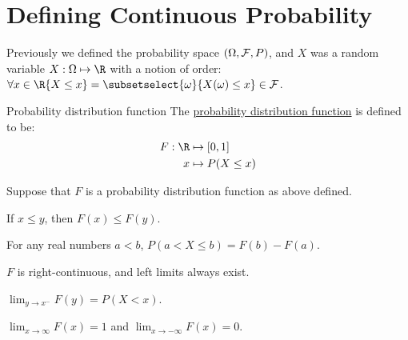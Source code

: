 \documentclass[../Main.tex]{subfiles}
\begin{document}
\section{Defining Continuous Probability}
Previously we defined the probability space $\left(\Omega, \mathcal{F}, P\right)$, and $X$ was a random variable $X : \Omega \mapsto \R$ with a notion of order: $\forall x \in \R \{X \leq x\} = \subsetselect{\omega}{X(\omega) \leq x} \in \sigalg$.
\begin{definition}{Probability distribution function}
    The \underline{probability distribution function} is defined to be:
    \begin{align*}
        F : \R &\mapsto [0, 1] \\
        x &\mapsto P(X \leq x)
    \end{align*}
\end{definition}
\begin{propositions}{
        Suppose that $F$ is a probability distribution function as above defined.
        \label{propsPDFProps}
    }
    \item If $x \leq y$, then $F(x) \leq F(y)$. \label{propPDFIncreasing}
    \item For any real numbers $a < b$, $P(a < X \leq b) = F(b) - F(a)$. \label{propPDFSubtract}
    \item $F$ is right-continuous, and left limits always exist. \label{propPDFContinuity}
    \item $\lim_{y \to x^-} F(y) = P(X < x)$.\label{propPDFStrictLessThan}
    \item $\lim_{x \to \infty} F(x) = 1$ and $\lim_{x \to -\infty} F(x) = 0$. \label{propPDFLimits}
\end{propositions}
\end{document}
